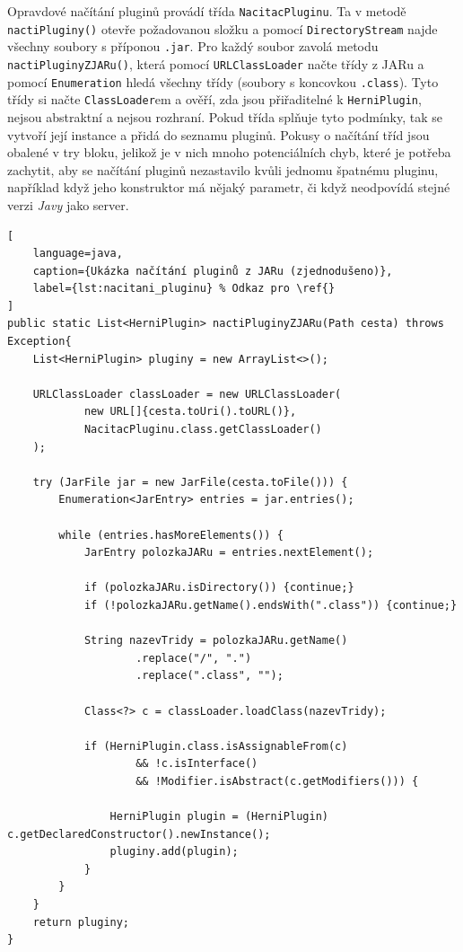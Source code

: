 Opravdové načítání pluginů provádí třída \texttt{NacitacPluginu}. Ta v metodě \texttt{nactiPluginy()} otevře požadovanou složku a pomocí \texttt{DirectoryStream} najde všechny soubory s příponou \texttt{.jar}. Pro každý soubor zavolá metodu \texttt{nactiPluginyZJARu()}, která pomocí \texttt{URLClassLoader} načte třídy z JARu a pomocí \texttt{Enumeration} hledá všechny třídy (soubory s koncovkou \texttt{.class}). Tyto třídy si načte \texttt{ClassLoader}em a ověří, zda jsou přiřaditelné k \texttt{HerniPlugin}, nejsou abstraktní a nejsou rozhraní. Pokud třída splňuje tyto podmínky, tak se vytvoří její instance a přidá do seznamu pluginů. Pokusy o načítání tříd jsou obalené v try bloku, jelikož je v nich mnoho potenciálních chyb, které je potřeba zachytit, aby se načítání pluginů nezastavilo kvůli jednomu špatnému pluginu, například když jeho konstruktor má nějaký parametr, či když neodpovídá stejné verzi \emph{Javy} jako server.

\begin{lstlisting}[
    language=java, 
    caption={Ukázka načítání pluginů z JARu (zjednodušeno)}, 
    label={lst:nacitani_pluginu} % Odkaz pro \ref{}
]
public static List<HerniPlugin> nactiPluginyZJARu(Path cesta) throws Exception{
    List<HerniPlugin> pluginy = new ArrayList<>();
    
    URLClassLoader classLoader = new URLClassLoader(
            new URL[]{cesta.toUri().toURL()},
            NacitacPluginu.class.getClassLoader()
    );
    
    try (JarFile jar = new JarFile(cesta.toFile())) {
        Enumeration<JarEntry> entries = jar.entries();

        while (entries.hasMoreElements()) {
            JarEntry polozkaJARu = entries.nextElement();

            if (polozkaJARu.isDirectory()) {continue;}
            if (!polozkaJARu.getName().endsWith(".class")) {continue;}

            String nazevTridy = polozkaJARu.getName()
                    .replace("/", ".")
                    .replace(".class", "");

            Class<?> c = classLoader.loadClass(nazevTridy);

            if (HerniPlugin.class.isAssignableFrom(c)
                    && !c.isInterface()
                    && !Modifier.isAbstract(c.getModifiers())) {

                HerniPlugin plugin = (HerniPlugin) c.getDeclaredConstructor().newInstance();
                pluginy.add(plugin);
            }
        }
    }
    return pluginy;
}
\end{lstlisting}

